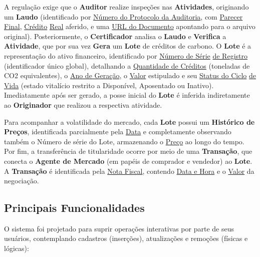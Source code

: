 \documentclass[12pt]{article}
\begin{document}
A regulação exige que o \textbf{Auditor} realize inspeções nas \textbf{Atividades}, originando um \textbf{Laudo} (identificado por \underline{Número do Protocolo da Auditoria}, com \underline{Parecer Final}, \underline{Crédito} \underline{Real} aferido, e uma \underline{URL do Documento} apontando para o arquivo original). Posteriormente, o \textbf{Certificador} analisa o \textbf{Laudo} e \textbf{Verifica} a \textbf{Atividade}, que por sua vez \textbf{Gera} um \textbf{Lote} de créditos de carbono. O \textbf{Lote} é a representação do ativo financeiro, identificado por \underline{Número de Série} \underline{de Registro} (identificador único global), detalhando a \underline{Quantidade de Créditos} (toneladas de CO2 equivalentes), o \underline{Ano de Geração}, o \underline{Valor} estipulado e seu \underline{Status do Ciclo} \underline{de Vida} (estado vitalício restrito a Disponível, Aposentado ou Inativo). Imediatamente após ser gerado, a posse inicial do \textbf{Lote} é inferida indiretamente ao \textbf{Originador} que realizou a respectiva atividade.

Para acompanhar a volatilidade do mercado, cada \textbf{Lote} possui um \textbf{Histórico de Preços}, identificada parcialmente pela \underline{Data} e completamente observando também o Número de série do Lote, armazenando o \underline{Preço} ao longo do tempo. Por fim, a transferência de titularidade ocorre por meio de uma \textbf{Transação}, que conecta o \textbf{Agente de Mercado} (em papéis de comprador e vendedor) ao \textbf{Lote}. A \textbf{Transação} é identificada pela \underline{Nota Fiscal}, contendo \underline{Data e Hora} e o \underline{Valor} da negociação.

\subsection{Principais Funcionalidades}
O sistema foi projetado para suprir operações interativas por parte de seus usuários, contemplando cadastros (inserções), atualizações e remoções (físicas e lógicas):
\end{document}
